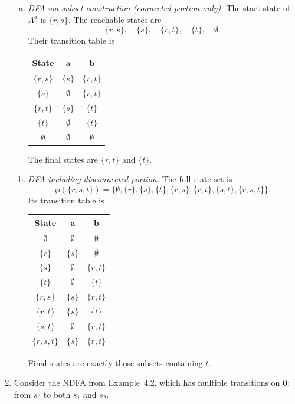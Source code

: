 \begin{enumerate}[{4.}1.]
\begin{enumerate}[(a)]
  \item \emph{DFA via subset construction (connected portion only).}
  The start state of $A^d$ is $\{r,s\}$.  The reachable states are
  \[
  \{r,s\},\quad \{s\},\quad \{r,t\},\quad \{t\},\quad \emptyset.
  \]
  Their transition table is
  \begin{center}\begin{tabular}{c|cc}
    State & $\pmb{a}$ & $\pmb{b}$ \\\hline
    $\{r,s\}$ & $\{s\}$ & $\{r,t\}$ \\
    $\{s\}$ & $\emptyset$ & $\{r,t\}$ \\
    $\{r,t\}$ & $\{s\}$ & $\{t\}$ \\
    $\{t\}$ & $\emptyset$ & $\{t\}$ \\
    $\emptyset$ & $\emptyset$ & $\emptyset$ \\
  \end{tabular}\end{center}
  The final states are $\{r,t\}$ and $\{t\}$.

  \item \emph{DFA including disconnected portion.}
  The full state set is
  \[
  \wp(\{r,s,t\})=\{\emptyset,\{r\},\{s\},\{t\},\{r,s\},\{r,t\},\{s,t\},\{r,s,t\}\}.
  \]
  Its transition table is
  \begin{center}\begin{tabular}{c|cc}
    State & $\pmb{a}$ & $\pmb{b}$ \\\hline
    $\emptyset$ & $\emptyset$ & $\emptyset$ \\
    $\{r\}$ & $\{s\}$ & $\emptyset$ \\
    $\{s\}$ & $\emptyset$ & $\{r,t\}$ \\
    $\{t\}$ & $\emptyset$ & $\{t\}$ \\
    $\{r,s\}$ & $\{s\}$ & $\{r,t\}$ \\
    $\{r,t\}$ & $\{s\}$ & $\{t\}$ \\
    $\{s,t\}$ & $\emptyset$ & $\{r,t\}$ \\
    $\{r,s,t\}$ & $\{s\}$ & $\{r,t\}$
  \end{tabular}\end{center}
  Final states are exactly those subsets containing $t$.

\end{enumerate}

\item Consider the NDFA from Example~4.2, which has multiple transitions on
$\pmb{0}$: from $s_0$ to both $s_1$ and $s_2$.


\end{enumerate}
